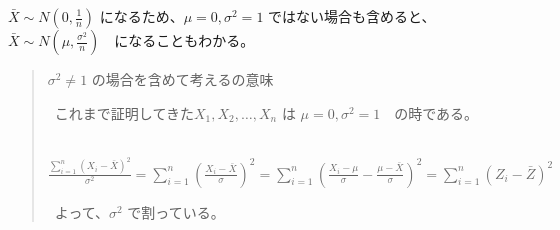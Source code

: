 \documentclass[
  letterpaper,
  DIV=11,
  numbers=noendperiod]{scrartcl}
\theoremstyle{plain}
\theoremstyle{remark}
\begin{document}
\(\bar{X} \sim N(0,\frac{1}{n})\) になるため、\(\mu = 0, \sigma^2 = 1\)
ではない場合も含めると、\(\bar{X} \sim N(\mu,\frac{\sigma^2}{n})\)　になることもわかる。

\begin{quote}
\(\sigma^2 \ne 1\) の場合を含めて考えるの意味

~これまで証明してきた\(X_1,X_2, \dots, X_n\) は
\(\mu = 0, \sigma^2 = 1\)　の時である。

~\(\frac{\sum_{i=1}^n (X_i - \bar{X})^2}{\sigma^2}=\sum_{i=1}^n (\frac{X_i - \bar{X}}{\sigma})^2= \sum_{i=1}^n (\frac{X_i-\mu}{\sigma}-\frac{\mu-\bar{X}}{\sigma})^2 = \sum_{i=1}^n (Z_i-\bar{Z})^2\)\\
\strut ~よって、\(\sigma^2\) で割っている。
\end{quote}


\printbibliography
\end{document}
